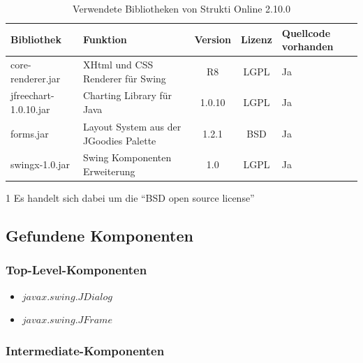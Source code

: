   \begin{table}[ht]
    \sffamily 
    \begin{center}
      \begin{threeparttable}
        \begin{tabular}{lp{4.5cm}ccp{2cm}}
          \toprule
          \textbf{Bibliothek} & \textbf{Funktion} & \textbf{Version} &
          \textbf{Lizenz} & \textbf{Quellcode vorhanden}\\
          \midrule
          core-renderer.jar & XHtml und CSS Renderer für Swing & R8 & LGPL &
          Ja\\
          jfreechart-1.0.10.jar & Charting Library für Java & 1.0.10 & LGPL
          & Ja\\
          forms.jar & Layout System aus der JGoodies Palette & 1.2.1 &
          BSD\tnote{1} & Ja\\
          swingx-1.0.jar & Swing Komponenten Erweiterung & 1.0 & LGPL & Ja\\
          \bottomrule
        \end{tabular}
        \caption{Verwendete Bibliotheken von Strukti Online 2.10.0}
        \label{tab:bibliothekenStruktiOnline}
        \begin{tablenotes}[++]\footnotesize 
          \item[1] Es handelt sich dabei um die ``BSD open source license''
        \end{tablenotes} 
      \end{threeparttable}
    \end{center}
  \end{table}
  
  \subsection{Gefundene Komponenten}
  
  \subsubsection{Top-Level-Komponenten}
  
  \begin{itemize}
    \item \(javax.swing.JDialog\)
    \item \(javax.swing.JFrame\)
  \end{itemize}
  
  \subsubsection{Intermediate-Komponenten}
  
